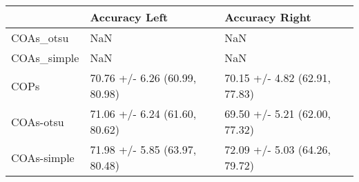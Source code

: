 \begin{tabular}{lll}
\toprule
{} &                  Accuracy Left &                 Accuracy Right \\
\midrule
COAs\_otsu   &                            NaN &                            NaN \\
COAs\_simple &                            NaN &                            NaN \\
COPs        &  70.76 +/- 6.26 (60.99, 80.98) &  70.15 +/- 4.82 (62.91, 77.83) \\
COAs-otsu   &  71.06 +/- 6.24 (61.60, 80.62) &  69.50 +/- 5.21 (62.00, 77.32) \\
COAs-simple &  71.98 +/- 5.85 (63.97, 80.48) &  72.09 +/- 5.03 (64.26, 79.72) \\
\bottomrule
\end{tabular}
